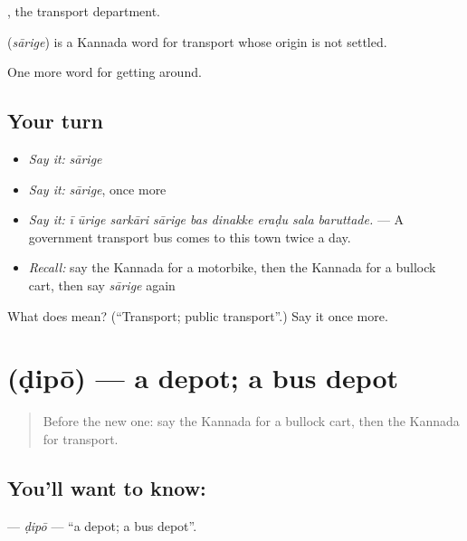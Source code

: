 , the transport department.

\begin{cousinweb}
\textbf{} (\emph{sārige}) is a Kannada word for transport whose origin is not settled.
\end{cousinweb}

\begin{grammarlens}[title={What you've built}]
One more word for getting around.
\end{grammarlens}

\subsection*{Your turn}
\begin{itemize}
\raggedright
  \item \emph{Say it:} \emph{sārige}
  \item \emph{Say it:} \emph{sārige}, once more
  \item \emph{Say it:} \emph{ī ūrige sarkāri sārige bas dinakke eraḍu sala baruttade.} — A government transport bus comes to this town twice a day.
  \item \emph{Recall:} say the Kannada for a motorbike, then the Kannada for a bullock cart, then say \emph{sārige} again
\end{itemize}

\begin{tcolorbox}[breakable,colback=teal!4,colframe=teal!35!black,title={Before you move on}]
What does  mean? (\textquotedblleft{}Transport; public transport\textquotedblright{}.) Say it once more.
\end{tcolorbox}
\section[\texorpdfstring{\kn{ಡಿಪೋ} (ḍipō)}{ಡಿಪೋ (ḍipō)}]{ (ḍipō) — a depot; a bus depot}

\label{lesson:KA-C452-dipo}



\begin{quote}
Before the new one: say the Kannada for a bullock cart, then the Kannada for transport.
\end{quote}

\subsection*{You'll want to know: }
\textbf{} — \emph{ḍipō} — \textquotedblleft{}a depot; a bus depot\textquotedblright{}.

